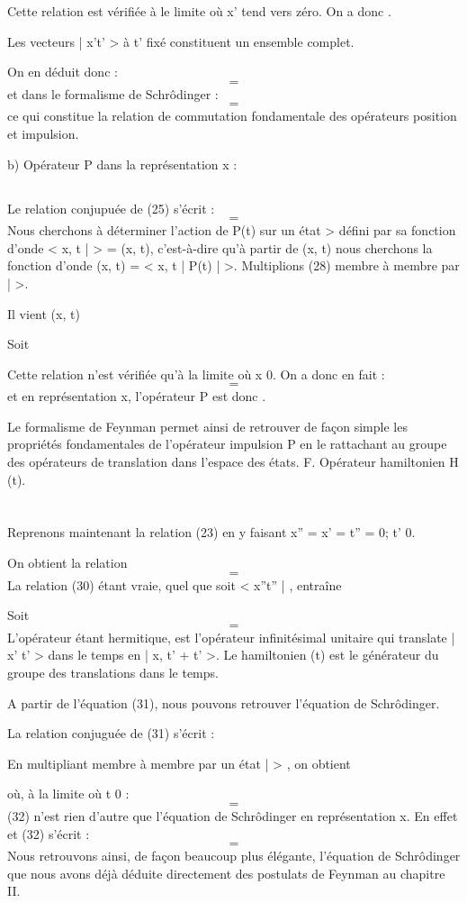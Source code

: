 Cette relation est vérifiée à le limite où x' tend vers zéro.
On a donc .

Les vecteurs | x't' > à t' fixé constituent un ensemble complet.

On en déduit donc :
\[
\tag{26}=
\]
et dans le formalisme de Schrôdinger :
\[
\tag{27}=
\]
ce qui constitue la relation de commutation fondamentale des opérateurs
position et impulsion.

b) Opérateur P dans la représentation x :
\subsection{}

Le relation conjupuée de (25) s'écrit :
\[
\tag{28}=
\]
Nous cherchons à déterminer l'action de P(t) sur un état > défini
par sa fonction d'onde < x, t |  > =  (x, t), c'est-à-dire qu'à partir
de (x, t) nous cherchons la fonction d'onde  (x, t) = < x, t | P(t) |  >.
Multiplions (28) membre à membre par |  >.

Il vient  (x, t)

Soit 

Cette relation n'est vérifiée qu'à la limite où x  0. On a donc en fait :
\[
\tag{29}=
\]
et en représentation x, l'opérateur P est donc .

 

Le formalisme de Feynman permet ainsi de retrouver de façon
simple les propriétés fondamentales de l'opérateur impulsion P en le rattachant au groupe des opérateurs de translation dans l'espace des états.
F. Opérateur hamiltonien H (t).
\section{}
Reprenons maintenant la relation (23) en y faisant
x'' = x' = t'' = 0; t'  0.

On obtient la relation
\[
\tag{30}=
\]
La relation (30) étant vraie, quel que soit < x''t'' | , entraîne

Soit
\[
\tag{31}=
\]
L'opérateur  étant hermitique,  est l'opérateur
infinitésimal unitaire qui translate | x' t' > dans le temps en
| x, t' + t' >.
Le hamiltonien (t) est le générateur du groupe des translations dans le
temps.

A partir de l'équation (31), nous pouvons retrouver l'équation
de Schrôdinger.

La relation conjuguée de (31) s'écrit :

En multipliant membre à membre par un état |  > , on obtient

où, à la limite où t  0 :
\[
\tag{32}=
\]
(32) n'est rien d'autre que l'équation de Schrôdinger en représentation x.
En effet
et (32) s'écrit :
\[
\tag{33}=
\]
Nous retrouvons ainsi, de façon beaucoup plus élégante, l'équation de
Schrôdinger que nous avons déjà déduite directement des postulats de
Feynman au chapitre II.

